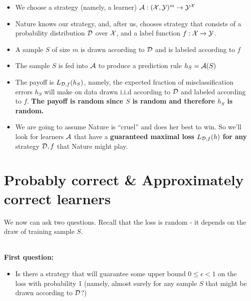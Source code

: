 {\begin{itemize}
    \item We choose a strategy (namely, a learner) $\mathcal{A}:(\mathcal{X},\mathcal{Y})^m \to \mathcal{Y}^{\mathcal{X}}$
      \item Nature knows our strategy, and, after us, chooses strategy that consists of a probability distribution $\mathcal{D}$ over $\mathcal{X}$, and a label function $f:\mathcal{X}\to\mathcal{Y}$. 
    \item A sample $S$ of size $m$ is drawn according to $\mathcal{D}$ and is labeled
      according to $f$
    \item The sample $S$ is fed into $\mathcal{A}$ to produce a prediction rule
      $h_S=\mathcal{A}(S)$
    \item The payoff is $L_{\mathcal{D},f}(h_S)$, namely, the expected fraction of misclassification errors $h_S$ will make on data drawn i.i.d according to $\mathcal{D}$ and labeled according to $f$.
    {\bf The payoff is random since $S$ is random and
      therefore $h_S$ is random.}
    \item We are going to assume Nature is ``cruel'' and does her best to win.
      So we'll look for learners $\mathcal{A}$ that have a {\bf guaranteed maximal 
      loss} $L_{\mathcal{D},f}(h)$ {\bf for any} strategy $\mathcal{D},f$ that Nature might play.
\end{itemize}

\section{Probably correct \& Approximately correct learners}
   We now can ask two questions. 
   Recall that the loss is random - it depends on the draw of training sample
       $S$.
       
       ~\\
{\bf First question:}\\   
   \begin{itemize}
     
      \item  Is there a strategy that will guarantee some upper bound $0\leq
       \epsilon<1$ on the loss 
   with probability 1 (namely, almost surely for any sample $S$ that might be
       drawn according to $\mathcal{D}$?) 
   \end{itemize}
  
}
